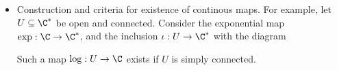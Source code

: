 \begin{itemize}
  \item Construction and criteria for existence of continous maps.
    For example, let $U \subseteq \C^\ast$ be open and connected. Consider the exponential map $\exp: \C \to \C^\ast$, and the inclusion $\iota:U \to \C^\ast$ with the diagram
    Such a map $\log: U \to \C$ exists if $U$ is simply connected.
\end{itemize}






